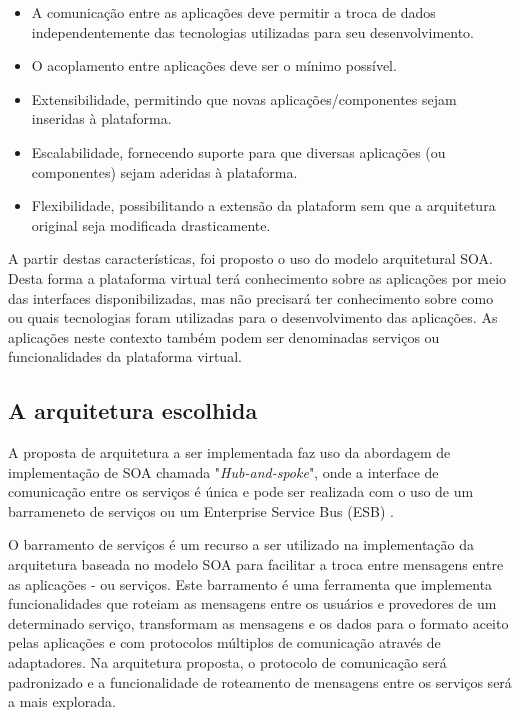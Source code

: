 \begin{itemize}
\item A comunicação entre as aplicações deve permitir a troca de dados independentemente das tecnologias utilizadas para seu desenvolvimento.
\item O acoplamento entre aplicações deve ser o mínimo possível.
\item Extensibilidade, permitindo que novas aplicações/componentes sejam inseridas à plataforma.
\item Escalabilidade, fornecendo suporte para que diversas aplicações (ou componentes) sejam aderidas à plataforma.
\item Flexibilidade,  possibilitando a extensão da plataform sem que a arquitetura original seja modificada drasticamente.
\end{itemize}

A partir destas características, foi proposto o uso do modelo arquitetural SOA. Desta forma a plataforma virtual terá conhecimento sobre as aplicações por meio das interfaces disponibilizadas, mas não precisará ter conhecimento sobre como ou quais tecnologias foram utilizadas para o desenvolvimento das aplicações. As aplicações neste contexto também podem ser denominadas serviços ou funcionalidades da plataforma virtual.

\subsection{A arquitetura escolhida}

A proposta de arquitetura a ser implementada faz uso da abordagem de implementação de SOA chamada "\textit{Hub-and-spoke}", onde a interface de comunicação entre os serviços é única e pode ser realizada com o uso de um barrameneto de serviços ou um Enterprise Service Bus (ESB) \cite{Bianco2007}.

O barramento de serviços é um recurso a ser utilizado na implementação da arquitetura baseada no modelo SOA para facilitar a troca entre mensagens entre as aplicações - ou serviços. Este barramento é uma ferramenta que implementa funcionalidades que roteiam as mensagens entre os usuários e provedores de um determinado serviço, transformam as mensagens e os dados para o formato aceito pelas aplicações e com protocolos múltiplos de comunicação através de adaptadores. Na arquitetura proposta, o protocolo de comunicação será padronizado e a funcionalidade de roteamento de mensagens entre os serviços será a mais explorada.

